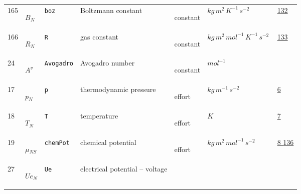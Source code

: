 \begin{longtable}{|p{1cm}|p{2.5cm}|p{4.5cm}|p{8cm}|p{3.0cm}|p{3cm}|p{1cm}|}
            165
             & \hypertarget{"v:165"}{ $ {B}{_{N}} $}
             & \verb|boz|
             & Boltzmann constant
             & \begin{lay}constant \end{lay}
             & $ kg \,m^{2} \,K^{-1} \,s^{-2} \, $
             &                 \hyperlink{"e:132"}{ 132 }
                 \\
            166
             & \hypertarget{"v:166"}{ $ {R}{_{N}} $}
             & \verb|R|
             & gas constant
             & \begin{lay}constant \end{lay}
             & $ kg \,m^{2} \,mol^{-1} \,K^{-1} \,s^{-2} \, $
             &                 \hyperlink{"e:133"}{ 133 }
                 \\
            24
             & \hypertarget{"v:24"}{ $ {{A^v}}{_{}} $}
             & \verb|Avogadro|
             & Avogadro number
             & \begin{lay}constant \end{lay}
             & $ mol^{-1} \, $
             & \\
            17
             & \hypertarget{"v:17"}{ $ {p}{_{N}} $}
             & \verb|p|
             & thermodynamic pressure
             & \begin{lay}effort \end{lay}
             & $ kg \,m^{-1} \,s^{-2} \, $
             &                 \hyperlink{"e:6"}{ 6 }
                 \\
            18
             & \hypertarget{"v:18"}{ $ {T}{_{N}} $}
             & \verb|T|
             & temperature
             & \begin{lay}effort \end{lay}
             & $ K \, $
             &                 \hyperlink{"e:7"}{ 7 }
                 \\
            19
             & \hypertarget{"v:19"}{ $ {\mu}{_{{N S}}} $}
             & \verb|chemPot|
             & chemical potential
             & \begin{lay}effort \end{lay}
             & $ kg \,m^{2} \,mol^{-1} \,s^{-2} \, $
             &                 \hyperlink{"e:8"}{ 8 }
                                 \hyperlink{"e:136"}{ 136 }
                 \\
            27
             & \hypertarget{"v:27"}{ $ {Ue}{_{N}} $}
             & \verb|Ue|
             & electrical potential -- voltage

\end{longtable}
